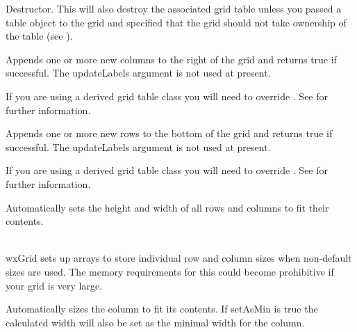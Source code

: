 Destructor. This will also destroy the associated grid table unless you passed a table
object to the grid and specified that the grid should not take ownership of the
table (see ).



\label{wxgridappendcols}


Appends one or more new columns to the right of the grid and returns true if
successful. The updateLabels argument is not used at present.

If you are using a derived grid table class you will need to override
. See
 for further information.



\label{wxgridappendrows}


Appends one or more new rows to the bottom of the grid and returns true if
successful. The updateLabels argument is not used at present.

If you are using a derived grid table class you will need to override
. See
 for further information.



\label{wxgridautosize}


Automatically sets the height and width of all rows and columns to fit their contents.

\\
wxGrid sets up arrays to store individual row and column sizes when non-default sizes are used.
The memory requirements for this could become prohibitive if your grid is very large.



\label{wxgridautosizecolumn}


Automatically sizes the column to fit its contents. If setAsMin is true the calculated width will
also be set as the minimal width for the column.

